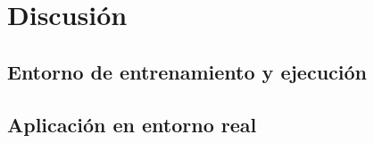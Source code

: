 \section{Discusión}

\subsection{Entorno de entrenamiento y ejecución}

\subsection{Aplicación en entorno real}